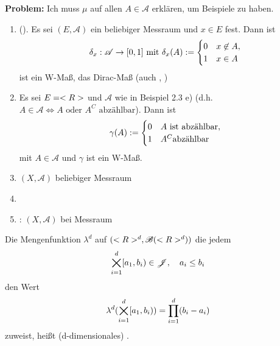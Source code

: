 \textbf{Problem:} Ich muss $\mu$ auf allen $A \in \mathscr{A}$ erklären, um Beispiele zu haben.

\begin{example}
	\begin{enumerate}
		\item (). Es sei $(E,\mathscr{A})$ ein beliebiger Messraum und $x \in E$ fest. Dann ist
		\begin{align}
			\delta_x: \mathscr{A} \to [0,1] \text{ mit } \delta_x(A) := \begin{cases}
				0 & x \not \in A,\\
				1 & x \in A
			\end{cases}\notag
		\end{align}
		ist ein W-Maß, das Dirac-Maß (auch , )
		\item Es sei $E=<R>$ und $\mathscr{A}$ wie in Beispiel 2.3 e) %
		(d.h. $A \in \mathscr{A} \Longleftrightarrow A \text{ oder } A^C \text{ abzählbar}$). Dann ist
		\begin{align}
		\gamma(A) := \begin{cases}
		0 & A \text{ ist abzählbar},\\
		1 & A^C \text{abzählbar}
		\end{cases}\notag
		\end{align} mit $A \in \mathscr{A}$ und $\gamma$ ist ein W-Maß.
		\item $(X,\mathscr{A})$ beliebiger Messraum
		\item {}
		\item {}: $(X,\mathscr{A})$ bei Messraum
	\end{enumerate}
\end{example}

\begin{definition}
	Die Mengenfunktion $\lambda^d$ auf $(<R>^d, \mathscr{B}(<R>^d))$ die jedem
	\begin{align}
		\bigtimes_{i=1}^{d} [a_1,b_i) \in \mathscr{J}, \quad a_i \le b_i \notag
	\end{align}
	den Wert
	\begin{align}
		\lambda^d(\bigtimes_{i=1}^{d} [a_1,b_i)) = \prod_{i=1}^{d}(b_i - a_i) \notag
	\end{align}
	zuweist, heißt (d-dimensionales) .
\end{definition}

